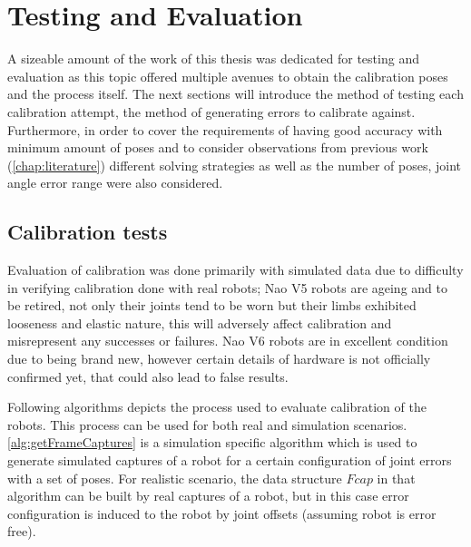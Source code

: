 \documentclass[english, printversion, nomenclature, notitle]{tuvisionthesis} %
\begin{document}
\chapter{Testing and Evaluation}

A sizeable amount of the work of this thesis was dedicated for testing and evaluation as this topic offered multiple avenues to obtain the calibration poses and the process itself. The next sections will introduce the method of testing each calibration attempt, the method of generating errors to calibrate against. Furthermore, in order to cover the requirements of having good accuracy with minimum amount of poses and to consider observations from previous work (\cref{chap:literature}) different solving strategies as well as the number of poses, joint angle error range were also considered.

\section{Calibration tests}

Evaluation of calibration was done primarily with simulated data due to difficulty in verifying calibration done with real robots; Nao V5 robots are ageing and to be retired, not only their joints tend to be worn but their limbs exhibited looseness and elastic nature, this will adversely affect calibration and misrepresent any successes or failures. Nao V6 robots are in excellent condition due to being brand new, however certain details of hardware is not officially confirmed yet, that could also lead to false results.

Following algorithms depicts the process used to evaluate calibration of the robots. This process can be used for both real and simulation scenarios. \cref{alg:getFrameCaptures} is a simulation specific algorithm which is used to generate simulated captures of a robot for a certain configuration of joint errors with a set of poses. For realistic scenario, the data structure $Fcap$ in that algorithm can be built by real captures of a robot, but in this case error configuration is induced to the robot by joint offsets (assuming robot is error free). 
\end{document}
